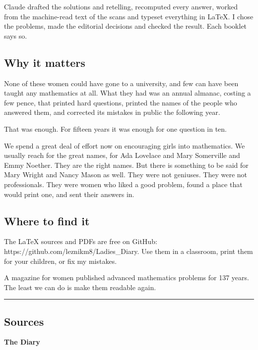 \documentclass[11pt,a4paper]{article}
\begin{document}
Claude drafted the solutions and retelling, recomputed every answer,
worked from the machine-read text of the scans and typeset everything in
LaTeX. I chose the problems, made the editorial decisions and checked
the result. Each booklet says so.

\hypertarget{why-it-matters}{%
\subsection{Why it matters}\label{why-it-matters}}

None of these women could have gone to a university, and few can have
been taught any mathematics at all. What they had was an annual almanac,
costing a few pence, that printed hard questions, printed the names of
the people who answered them, and corrected its mistakes in public the
following year.

That was enough. For fifteen years it was enough for one question in
ten.

We spend a great deal of effort now on encouraging girls into
mathematics. We usually reach for the great names, for Ada Lovelace and
Mary Somerville and Emmy Noether. They are the right names. But there is
something to be said for Mary Wright and Nancy Mason as well. They were
not geniuses. They were not professionals. They were women who liked a
good problem, found a place that would print one, and sent their answers
in.

\hypertarget{where-to-find-it}{%
\subsection{Where to find it}\label{where-to-find-it}}

The LaTeX sources and PDFs are free on GitHub:
https://github.com/leznikm8/Ladies\_Diary. Use them in a classroom,
print them for your children, or fix my mistakes.

A magazine for women published advanced mathematics problems for 137
years. The least we can do is make them readable again.

\begin{center}\rule{0.5\linewidth}{0.5pt}\end{center}

\hypertarget{sources}{%
\subsection{Sources}\label{sources}}

\textbf{The Diary}
\end{document}
